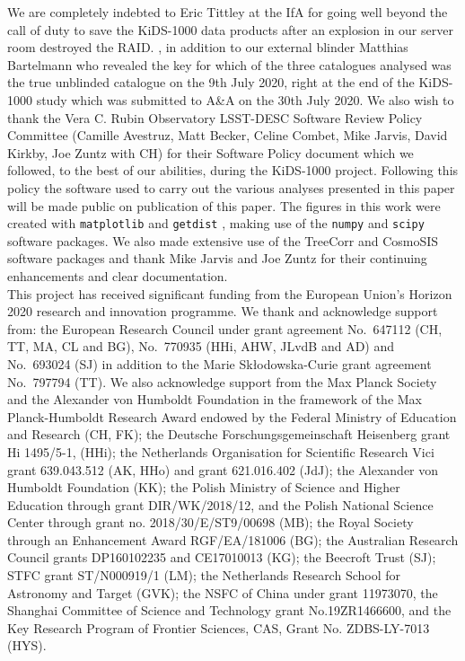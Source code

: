 \documentclass{aa}
\newcommand{\ch}[1]{{\color{purple}{#1}}}
\newcommand{\software}[1]{\texttt{#1}}
\begin{document}
\begin{acknowledgements}
We are completely indebted to Eric Tittley at the IfA for going well beyond the call of duty to save the KiDS-1000 data products after an explosion in our server room destroyed the RAID.   \ch{We thank our anonymous referee for their positive feedback and useful comments}, in addition to our external blinder Matthias Bartelmann who revealed the key for which of the three catalogues analysed was the true unblinded catalogue on the 9th July 2020, right at the end of the KiDS-1000 study which was submitted to A\&A on the 30th July 2020.   We also wish to thank the Vera C. Rubin Observatory LSST-DESC Software Review Policy Committee (Camille Avestruz, Matt Becker, Celine Combet, Mike Jarvis, David Kirkby, Joe Zuntz with CH) for their Software Policy document which we followed, to the best of our abilities, during the KiDS-1000 project.   Following this policy the software used to carry out the various analyses presented in this paper will be made public on publication of this paper. 
The figures in this work were created with \software{matplotlib} \citep{Hunter2007} and \software{getdist} \citep{Lewis2019}, making use of the 
\software{numpy} \citep{Oliphant2006} and \software{scipy} \citep{Jones2001} software packages. We also made extensive use of the {\sc TreeCorr} and {\sc CosmoSIS} software packages and thank
Mike Jarvis and Joe Zuntz for their continuing enhancements and clear documentation.\\

This project has received significant funding from the European Union's Horizon 2020 research and innovation programme.  We thank and acknowledge support from: the European Research Council under grant agreement No.~647112 (CH, TT, MA, CL and BG), No.~770935 (HHi, AHW, JLvdB and AD) and No.~693024 (SJ) in addition to the Marie Sk\l{}odowska-Curie grant agreement No.~797794 (TT).   We also acknowledge support from the Max Planck Society and the Alexander von Humboldt Foundation in the framework of the Max Planck-Humboldt Research Award endowed by the Federal Ministry of Education and Research (CH, FK);  the Deutsche Forschungsgemeinschaft Heisenberg grant Hi 1495/5-1, (HHi);  the Netherlands Organisation for Scientific Research Vici grant 639.043.512 (AK, HHo) and grant 621.016.402 (JdJ); the Alexander von Humboldt Foundation (KK);  the Polish Ministry of Science and Higher Education through grant DIR/WK/2018/12, and the Polish National Science Center through grant no. 2018/30/E/ST9/00698 (MB); the Royal Society through an Enhancement Award RGF/EA/181006 (BG);  the Australian Research Council grants DP160102235 and CE17010013 (KG);  the Beecroft Trust (SJ);  STFC grant ST/N000919/1 (LM);  the Netherlands Research School for Astronomy and Target (GVK); the NSFC of China under grant 11973070, the Shanghai Committee of Science and Technology grant No.19ZR1466600, and the Key Research Program of Frontier Sciences, CAS, Grant No. ZDBS-LY-7013 (HYS).\\


\end{acknowledgements}
\end{document}
